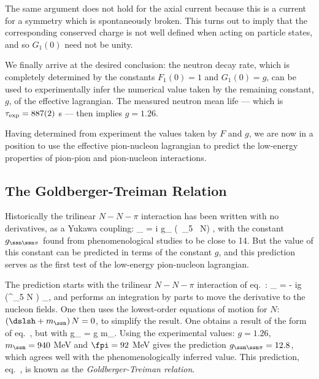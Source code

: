 The same argument does not hold for the axial current
because this is a current for a symmetry which is
spontaneously broken. This turns out to imply that the
corresponding conserved charge is not well defined when
acting on particle states, and so $G_1(0)$ need not be
unity.

We finally arrive at the desired conclusion: the neutron
decay rate, which is completely determined by the constants
$F_1(0) = 1$ and $G_1(0) = g$, can be used to experimentally
infer the numerical value taken by the remaining constant,
$g$, of the effective lagrangian. The measured neutron mean
life --- which is $\tau_{\rm exp} = 887(2)$ s --- then
implies $g = 1.26$.

Having determined from experiment the values taken by $F$
and $g$, we are now in a position to use the effective
pion-nucleon lagrangian to predict the low-energy
properties of pion-pion and pion-nucleon interactions.

\subsection{The Goldberger-Treiman Relation}

Historically the trilinear $N-N-\pi$ interaction has been
written with no derivatives, as a Yukawa coupling: 
%
\eq
\label{yukawaform}
\Scl_{\ssn\ssn\pi} = i g_{\ssn\ssn\pi} \; 
(\Nbr \, \gamma_5 \vec\tau \, N)  \cdot
\vec\pi,
\eeq
%
with the constant $g_{\ssn\ssn\pi}$ found from
phenomenological studies to be close to 14. But the value
of this constant can be predicted in terms of the constant
$g$, and this prediction serves as the first test of the
low-energy pion-nucleon lagrangian.

The prediction starts with the trilinear $N-N-\pi$
interaction of
eq.~:
%
\eq
\label{trilinearnnpi}
\Scl_{\ssn\ssn\pi} = - \; {ig  \fpi} \, 
\left(\Nbr \gamma^\mu \gamma_5
\vec \tau N \right) \cdot \partial_\mu \vec \pi , \eeq
%
and performs an integration by parts to move the derivative
to the nucleon fields. One then uses the lowest-order
equations of motion for $N$: \ie\ $(\dslsh + m_\ssn)\, N =
0$, to simplify the result. One obtains a result of the
form of eq.~, but with  
%
\eq
\label{predictionforgpin}
g_{\ssn\ssn\pi} = {g m_\ssn \over \fpi}.
\eeq
%
Using the experimental values: $g = 1.26$, $m_\ssn = 940$
MeV and $\fpi = 92$ MeV gives the prediction
$g_{\ssn\ssn\pi} = 12.8$, which agrees well with the
phenomenologically inferred value. This prediction,
eq.~, is known as the {\em
Goldberger-Treiman relation}.


